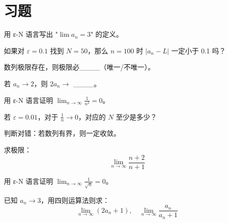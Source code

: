 \section{习题}


\begin{exercise}[0]
用 ε-N 语言写出 "\(\lim a_n = 3\)" 的定义。
\end{exercise}

\begin{exercise}[0]
如果对 \(\varepsilon = 0.1\) 找到 \(N = 50\)，那么 \(n = 100\) 时 \(|a_n - L|\) 一定小于 0.1 吗？
\end{exercise}

\begin{exercise}[0]
数列极限存在，则极限必\_\_\_\_（唯一/不唯一）。
\end{exercise}

\begin{exercise}[0]
若 \(a_n \to 2\)，则 \(2a_n \to\) \_\_\_\_。
\end{exercise}


\begin{exercise}[1]
用 ε-N 语言证明 \(\displaystyle \lim_{n\to\infty} \frac{1}{n^2} = 0\)。
\end{exercise}

\begin{exercise}[1]
若 \(\varepsilon = 0.01\)，对于 \(\frac{1}{n} \to 0\)，对应的 \(N\) 至少是多少？
\end{exercise}

\begin{exercise}[1]
判断对错：若数列有界，则一定收敛。
\end{exercise}

\begin{exercise}[1]
求极限：
\[
\lim_{n\to\infty} \frac{n+2}{n+1}
\]
\end{exercise}


\begin{exercise}[2]
用 ε-N 语言证明 \(\displaystyle \lim_{n\to\infty} \frac{1}{\sqrt{n}} = 0\)。
\end{exercise}

\begin{exercise}[2]
已知 \(a_n \to 3\)，用四则运算法则求：
\[
\lim_{n\to\infty} (2a_n + 1),\quad \lim_{n\to\infty} \frac{a_n}{a_n + 1}
\]
\end{exercise}

